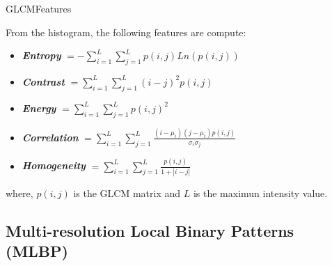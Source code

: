 \documentclass[10pt]{beamer}
\newcommand{\1}{
	\setbeamertemplate{background}{
		\texttt{[image: img/1\_dna]}
		\tikz[overlay] \fill[fill opacity=0.75,fill=white] (0,0) rectangle (-\paperwidth,\paperheight);
	}
}
\begin{document}
\begin{frame}{GLCM}{Features}
	\begin{block}{}
		From the histogram, the following features are compute:
		\begin{itemize}
			\item \textbf{\textit{Entropy}} $ = -\sum_{i=1}^{L}\sum_{j=1}^{L} p(i, j)Ln(p(i,j))$
			\item \textbf{\textit{Contrast}} $  =  \sum_{i=1}^{L}\sum_{j=1}^{L} (i-j)^2 p(i, j)$
			\item \textbf{\textit{Energy}} $ =  \sum_{i=1}^{L}\sum_{j=1}^{L} p(i,j)^2$
			\item \textbf{\textit{Correlation}} $ =  \sum_{i=1}^{L}\sum_{j=1}^{L}  \frac{ (i - \mu_i)(j - \mu_i)p(i, j)  }{ \sigma_i \sigma_j }     $
			\item \textbf{\textit{Homogeneity}} $ =  \sum_{i=1}^{L}\sum_{j=1}^{L}  \frac{ p(i, j) }{ 1 + | i - j | }    $
		\end{itemize}
	\end{block}
	
	\begin{block}{}
		where, $p(i, j)$ is the GLCM matrix and $L$ is the maximun intensity value.
		
	\end{block}
\end{frame}



\subsection{Multi-resolution Local Binary Patterns (MLBP)}
\end{document}
